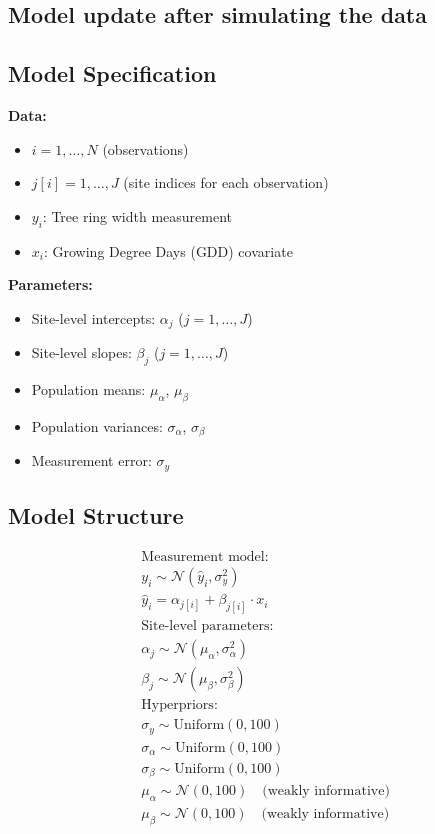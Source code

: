 \documentclass[a4paper,12pt]{article}
\begin{document}
\subsection*{Model update after simulating the data}

\subsection*{Model Specification}

\textbf{Data:}
\begin{itemize}
    \item $i = 1, \dots, N$ (observations)
    \item $j[i] = 1, \dots, J$ (site indices for each observation)
    \item $y_i$: Tree ring width measurement
    \item $x_i$: Growing Degree Days (GDD) covariate
\end{itemize}

\textbf{Parameters:}
\begin{itemize}
    \item Site-level intercepts: $\alpha_j$ ($j = 1, \dots, J$)
    \item Site-level slopes: $\beta_j$ ($j = 1, \dots, J$)
    \item Population means: $\mu_\alpha$, $\mu_\beta$
    \item Population variances: $\sigma_\alpha$, $\sigma_\beta$
    \item Measurement error: $\sigma_y$
\end{itemize}

\subsection*{Model Structure}

\begin{align*}
&\text{Measurement model:} \\
&y_i \sim \mathcal{N}(\hat{y}_i, \sigma_y^2) \\
&\hat{y}_i = \alpha_{j[i]} + \beta_{j[i]} \cdot x_i \\[2ex]
%
&\text{Site-level parameters:} \\
&\alpha_j \sim \mathcal{N}(\mu_\alpha, \sigma_\alpha^2) \\
&\beta_j \sim \mathcal{N}(\mu_\beta, \sigma_\beta^2) \\[2ex]
%
&\text{Hyperpriors:} \\
&\sigma_y \sim \text{Uniform}(0, 100) \\
&\sigma_\alpha \sim \text{Uniform}(0, 100) \\
&\sigma_\beta \sim \text{Uniform}(0, 100) \\
&\mu_\alpha \sim \mathcal{N}(0, 100) \quad \text{(weakly informative)} \\
&\mu_\beta \sim \mathcal{N}(0, 100) \quad \text{(weakly informative)}
\end{align*}
\end{document}
